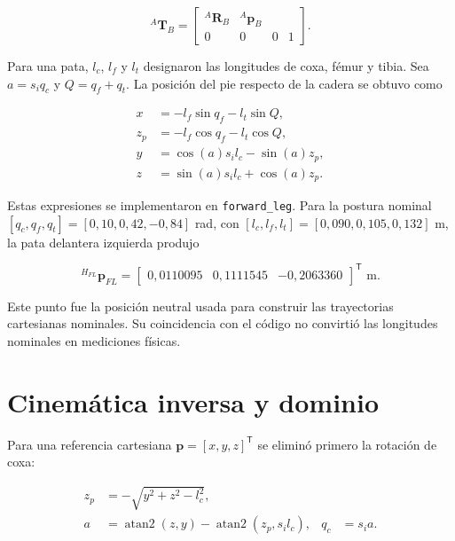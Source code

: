 \begin{equation}
{}^A\mathbf T_B=
\begin{bmatrix}
{}^A\mathbf R_B & {}^A\mathbf p_B\\
0&0&0&1
\end{bmatrix}.
\label{eq:homogeneous-nova}
\end{equation}

Para una pata, $l_c$, $l_f$ y $l_t$ designaron las longitudes de coxa, fémur y
tibia. Sea $a=s_iq_c$ y $Q=q_f+q_t$. La posición del pie respecto de la cadera
se obtuvo como

\begin{align}
x &= -l_f\sin q_f-l_t\sin Q,\label{eq:nova-fkx}\\
z_p &= -l_f\cos q_f-l_t\cos Q,\label{eq:nova-fkzp}\\
y &= \cos(a)s_il_c-\sin(a)z_p,\label{eq:nova-fky}\\
z &= \sin(a)s_il_c+\cos(a)z_p.\label{eq:nova-fkz}
\end{align}

Estas expresiones se implementaron en \texttt{forward\_leg}. Para la postura
nominal $[q_c,q_f,q_t]=[0,10,0,42,-0,84]$ rad, con
$[l_c,l_f,l_t]=[0,090,0,105,0,132]$ m, la pata delantera izquierda produjo

\begin{equation}
{}^{H_{FL}}\mathbf p_{FL}=
\begin{bmatrix}0,0110095&0,1111545&-0,2063360\end{bmatrix}^{\mathsf T}\text{ m}.
\label{eq:nova-fk-example}
\end{equation}

Este punto fue la posición neutral usada para construir las trayectorias
cartesianas nominales. Su coincidencia con el código no convirtió las
longitudes nominales en mediciones físicas.

\section{Cinemática inversa y dominio}

Para una referencia cartesiana $\mathbf p=[x,y,z]^{\mathsf T}$ se eliminó
primero la rotación de coxa:

\begin{align}
z_p&=-\sqrt{y^2+z^2-l_c^2},\label{eq:nova-ikzp}\\
a&=\operatorname{atan2}(z,y)-\operatorname{atan2}(z_p,s_il_c),
&q_c&=s_ia.\label{eq:nova-ikcoxa}
\end{align}

